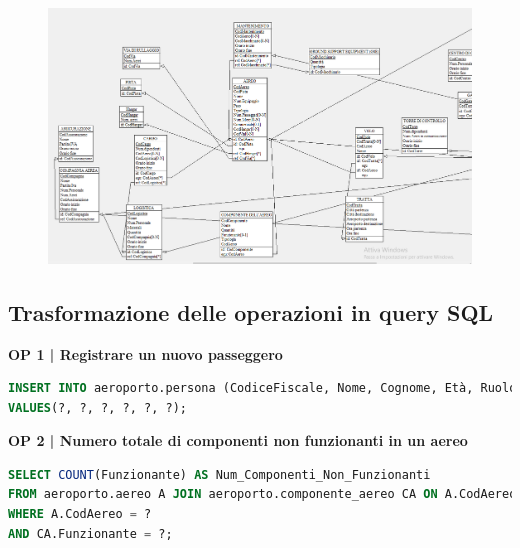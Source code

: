 \begin{figure}
	\includegraphics[width=1.2\textwidth]{./img/Schema_Logico/Schema_Logico2.png}
	\label{fig:logico2}
\end{figure}

\restoregeometry


\newpage

\subsection{Trasformazione delle operazioni in query SQL}


\textbf{\small OP 1 | Registrare un nuovo passeggero}

	
\begin{lstlisting}[language=SQL]
INSERT INTO aeroporto.persona (CodiceFiscale, Nome, Cognome, Età, Ruolo,  CodVolo )
VALUES(?, ?, ?, ?, ?, ?); 
\end{lstlisting} %


\textbf{\small OP 2 | Numero totale di componenti non funzionanti in un aereo}\\

\begin{lstlisting}[language=SQL]
SELECT COUNT(Funzionante) AS Num_Componenti_Non_Funzionanti
FROM aeroporto.aereo A JOIN aeroporto.componente_aereo CA ON A.CodAereo = CA.CodAereo
WHERE A.CodAereo = ?
AND CA.Funzionante = ?;
\end{lstlisting}

